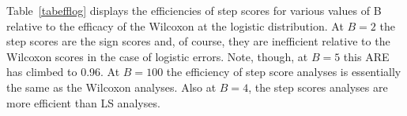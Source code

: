 
Table~\ref{tabefflog} displays the  efficiencies of step scores for various values of B relative to the efficacy of the Wilcoxon at the logistic distribution. 
At $B=2$ the step scores are the sign scores and, of course, they are inefficient relative to the Wilcoxon scores in the case of logistic errors.
Note, though, at $B=5$ this ARE has climbed to 0.96.
At $B=100$ the efficiency of step score analyses is essentially the same as the Wilcoxon analyses.
Also at $B=4$, the step scores analyses are more efficient than LS analyses.

